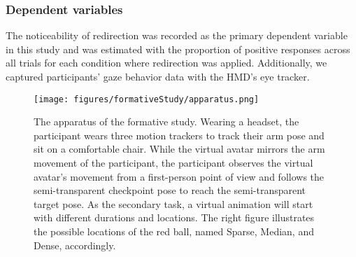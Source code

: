 
\subsubsection{Dependent variables}
The noticeability of redirection was recorded as the primary dependent variable in this study and was estimated with the proportion of positive responses across all trials for each condition where redirection was applied.
Additionally, we captured participants' gaze behavior data with the HMD's eye tracker.


\begin{figure}[t]
    \centering
    \texttt{[image: figures/formativeStudy/apparatus.png]}
    \caption{The apparatus of the formative study. 
    Wearing a headset, the participant wears three motion trackers to track their arm pose and sit on a comfortable chair. 
    While the virtual avatar mirrors the arm movement of the participant, the participant observes the virtual avatar's movement from a first-person point of view and follows the semi-transparent checkpoint pose to reach the semi-transparent target pose.
    As the secondary task, a virtual animation will start with different durations and locations.
    The right figure illustrates the possible locations of the red ball, named Sparse, Median, and Dense, accordingly.}
    \label{figure:formalapparatus}
\end{figure}


